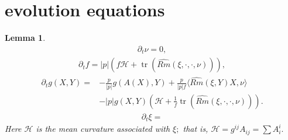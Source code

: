 \documentclass{amsart}
\newtheorem{lemma}[theorem]{Lemma}
\theoremstyle{definition}
\theoremstyle{remark}
\numberwithin{equation}{section}
\begin{document}
\section{evolution equations}
\begin{lemma}
\begin{align}
\partial_t\nu=0,
\end{align}
\begin{align}
\partial_t f =|p|(f\mathcal{H}+\operatorname{tr} (\widehat{Rm}(\xi,\cdot,\cdot,\nu))),
\end{align}
\begin{align}
\partial_tg(X,Y)=&-\frac{p}{|p|}g(A(X),Y)+\frac{p}{|p|f}\langle \widehat{Rm}(\xi,Y)X,\nu\rangle\\
&-
|p|g(X,Y)(\mathcal{H}+\frac{1}{f}\operatorname{tr} (\widehat{Rm}(\xi,\cdot,\cdot,\nu))).\nonumber
\end{align}
\begin{align}
\partial_t\xi=%
\end{align}
Here $\mathcal{H}$ is the mean curvature associated with $\xi;$ that is, $\mathcal{H}=g^{ij} A _{ij}=\sum  A _i^i.$
\end{lemma}
\end{document}
